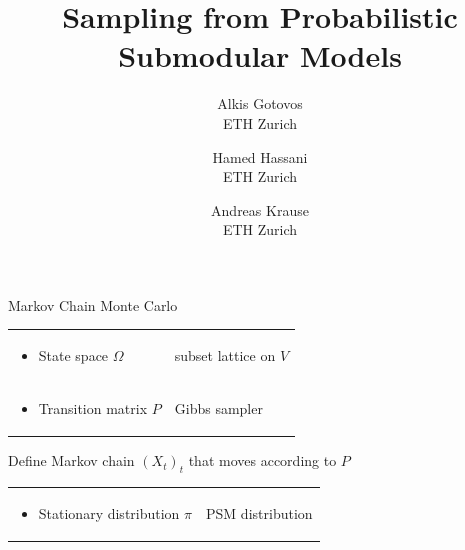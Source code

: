 \documentclass[mathserif]{beamer}
\title[Sampling from Probabilistic Submodular Models]
{Sampling from Probabilistic Submodular Models}
\author[Alkis Gotovos]{
\vspace{1in}
\normalsize
\parbox{1in}{Alkis Gotovos\\{\footnotesize ETH Zurich}}\and
\parbox{1in}{Hamed Hassani\\{\footnotesize ETH Zurich}}\and
\parbox{1in}{Andreas Krause\\{\footnotesize ETH Zurich}}
}
\begin{document}


\begin{frame}{Markov Chain Monte Carlo}
\begin{tabular}{*{2}{@{}l}}
\begin{minipage}{0.45\textwidth}
\begin{itemize}
\item State space $\Omega$
\end{itemize}
\end{minipage} & \color{col1}subset lattice on $V$\\[1em]
\begin{minipage}{0.45\textwidth}
\begin{itemize}
\item Transition matrix $P$
\end{itemize}
\end{minipage} & \color{col1}Gibbs sampler
\end{tabular}

\vspace{3em}
Define Markov chain $\left(X_t\right)_t$ that moves according to $P$

\vspace{2em}
\begin{tabular}{*{2}{@{}l}}
\begin{minipage}{0.45\textwidth}
\begin{itemize}
\item Stationary distribution $\pi$
\end{itemize}
\end{minipage} & \color{col1}PSM distribution
\end{tabular}
\end{frame}
\end{document}
